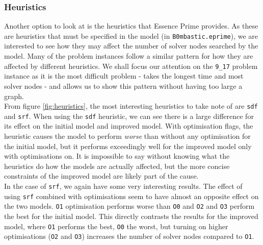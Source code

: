 \documentclass{article}
\newcommand{\n}[0]{\\[\baselineskip]}
\begin{document}
\subsubsection{Heuristics}
Another option to look at is the heuristics that Essence Prime provides. As these are heuristics that must be specified in the model (in \texttt{B0mbastic.eprime}), we are interested to see how they may affect the number of solver nodes searched by the model. Many of the problem instances follow a similar pattern for how they are affected by different heuristics. We shall focus our attention on the \texttt{9\_17} problem instance as it is the most difficult problem - takes the longest time and most solver nodes - and allows us to show this pattern without having too large a graph.
\n
From figure \ref{fig:heuristics}, the most interesting heuristics to take note of are \texttt{sdf} and \texttt{srf}. When using the \texttt{sdf} heuristic, we can see there is a large difference for its effect on the initial model and improved model. With optimisation flags, the heuristic causes the model to perform \textit{worse} than without any optimisation for the initial model, but it performs exceedingly well for the improved model only with optimisations on. It is impossible to say without knowing what the heuristics do how the models are actually affected, but the more concise constraints of the improved model are likely part of the cause. 
\n
In the case of \texttt{srf}, we again have some very interesting results. The effect of using \texttt{srf} combined with optimisations seem to have almost an opposite effect on the two models. \texttt{O1} optimisation performs worse than \texttt{O0} and \texttt{O2} and \texttt{O3} perform the best for the initial model. This directly contrasts the results for the improved model, where \texttt{O1} performs the best, \texttt{O0} the worst, but turning on higher optimisations (\texttt{O2} and \texttt{O3}) increases the number of solver nodes compared to \texttt{O1}.
\end{document}

